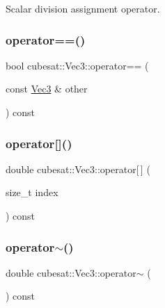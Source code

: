 Scalar division assignment operator. 

\mbox{\label{structcubesat_1_1Vec3_a07e2df1ba6fb654bf2edb42d06ced210}} 
\subsubsection{\texorpdfstring{operator==()}{operator==()}}
{\footnotesize\ttfamily bool cubesat\+::\+Vec3\+::operator== (\begin{DoxyParamCaption}\item[{const \hyperlink{structcubesat_1_1Vec3}{Vec3} \&}]{other }\end{DoxyParamCaption}) const\hspace{0.3cm}{\ttfamily [inline]}}

\mbox{\label{structcubesat_1_1Vec3_a1464c751aea56a9d964d97dafadcec38}} 
\subsubsection{\texorpdfstring{operator[]()}{operator[]()}}
{\footnotesize\ttfamily double cubesat\+::\+Vec3\+::operator\mbox{[}$\,$\mbox{]} (\begin{DoxyParamCaption}\item[{size\+\_\+t}]{index }\end{DoxyParamCaption}) const\hspace{0.3cm}{\ttfamily [inline]}}

\mbox{\label{structcubesat_1_1Vec3_ac9662dfb3fc8768396f3eec95d88fd90}} 
\subsubsection{\texorpdfstring{operator$\sim$()}{operator~()}}
{\footnotesize\ttfamily double cubesat\+::\+Vec3\+::operator$\sim$ (\begin{DoxyParamCaption}{ }\end{DoxyParamCaption}) const\hspace{0.3cm}{\ttfamily [inline]}}



